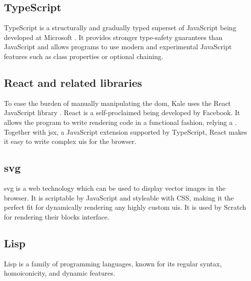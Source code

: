 \subsection{TypeScript}
TypeScript is a structurally and gradually typed superset of JavaScript being
developed at Microsoft \citep{Typescript}. It provides stronger type-safety
guarantees than JavaScript and allows programs to use modern and experimental
JavaScript features such as class properties or optional chaining. 


\subsection{React and related libraries}
To ease the burden of manually manipulating the \ac{dom}, Kale uses the React
JavaScript library \citep{React}. React is a self-proclaimed  being developed by Facebook. It
allows the program to write rendering
code in a functional fashion, relying a . Together with \ac{jsx}, a JavaScript extension supported by
TypeScript, React makes it easy to write complex \acp{ui} for the browser.

\subsection{\acf{svg}}
\ac{svg} is a web technology which can be used to display vector images in the
browser. It is scriptable by JavaScript and styleable with CSS, making it the
perfect fit for dynamically rendering any highly custom \acp{ui}. It is used by
Scratch for rendering their blocks interface.

\subsection{Lisp}
Lisp is a family of programming languages, known for its regular syntax,
homoiconicity, and dynamic features.
